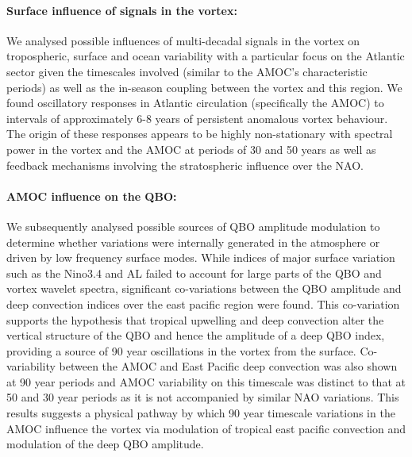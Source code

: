 \paragraph{Surface influence of signals in the vortex:}
We analysed possible influences of multi-decadal signals in the vortex on tropospheric, surface and ocean variability with a particular focus on the Atlantic sector given the timescales involved (similar to the AMOC's characteristic periods) as well as the in-season coupling between the vortex and this region. We found oscillatory responses in Atlantic circulation (specifically the AMOC) to intervals of approximately 6-8 years of persistent anomalous vortex behaviour. The origin of these responses appears to be highly non-stationary with spectral power in the vortex and the AMOC at periods of 30 and 50 years as well as feedback mechanisms involving the stratospheric influence over the NAO. 

\paragraph{AMOC influence on the QBO:}
We subsequently analysed possible sources of QBO amplitude modulation to determine whether variations were internally generated in the atmosphere or driven by low frequency surface modes. While indices of major surface variation such as the Nino3.4 and AL failed to account for large parts of the QBO and vortex wavelet spectra, significant co-variations between the QBO amplitude and deep convection indices over the east pacific region were found. This co-variation supports the hypothesis that tropical upwelling and deep convection alter the vertical structure of the QBO and hence the amplitude of a deep QBO index, providing a source of 90 year oscillations in the vortex from the surface. Co-variability between the AMOC and East Pacific deep convection was also shown at 90 year periods and AMOC variability on this timescale was distinct to that at 50 and 30 year periods as it is not accompanied by similar NAO variations. This results suggests a physical pathway by which 90 year timescale variations in the AMOC influence the vortex via modulation of tropical east pacific convection and modulation of the deep QBO amplitude. 

